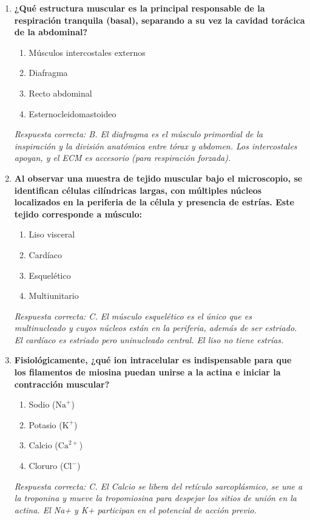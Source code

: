 \begin{enumerate}[label=\textbf{\arabic*.}]
    \item \textbf{¿Qué estructura muscular es la principal responsable de la respiración tranquila (basal), separando a su vez la cavidad torácica de la abdominal?}
    \begin{enumerate}
        \item[A)] Músculos intercostales externos
        \item[B)] Diafragma
        \item[C)] Recto abdominal
        \item[D)] Esternocleidomastoideo
    \end{enumerate}
    \textit{Respuesta correcta: B. El diafragma es el músculo primordial de la inspiración y la división anatómica entre tórax y abdomen. Los intercostales apoyan, y el ECM es accesorio (para respiración forzada).}

    \item \textbf{Al observar una muestra de tejido muscular bajo el microscopio, se identifican células cilíndricas largas, con múltiples núcleos localizados en la periferia de la célula y presencia de estrías. Este tejido corresponde a músculo:}
    \begin{enumerate}
        \item[A)] Liso visceral
        \item[B)] Cardíaco
        \item[C)] Esquelético
        \item[D)] Multiunitario
    \end{enumerate}
    \textit{Respuesta correcta: C. El músculo esquelético es el único que es multinucleado y cuyos núcleos están en la periferia, además de ser estriado. El cardíaco es estriado pero uninucleado central. El liso no tiene estrías.}

    \item \textbf{Fisiológicamente, ¿qué ion intracelular es indispensable para que los filamentos de miosina puedan unirse a la actina e iniciar la contracción muscular?}
    \begin{enumerate}
        \item[A)] Sodio ($\mathrm{Na}^{+}$)
        \item[B)] Potasio ($\mathrm{K}^{+}$)
        \item[C)] Calcio ($\mathrm{Ca}^{2+}$)
        \item[D)] Cloruro ($\mathrm{Cl}^{-}$)
    \end{enumerate}
    \textit{Respuesta correcta: C. El Calcio se libera del retículo sarcoplásmico, se une a la troponina y mueve la tropomiosina para despejar los sitios de unión en la actina. El Na+ y K+ participan en el potencial de acción previo.}


\end{enumerate}
